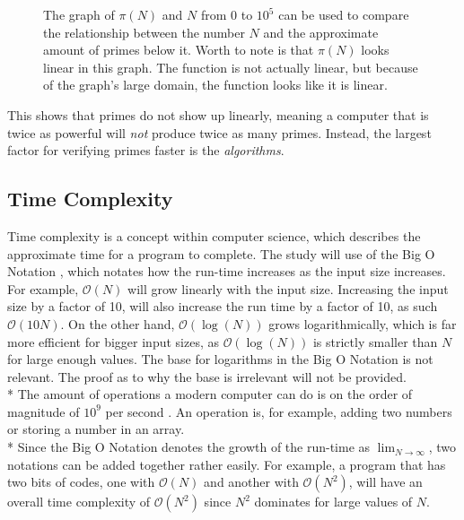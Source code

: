 \documentclass[main.tex]{subfiles}
\begin{document}
\begin{figure}[h]
  \begin{center}
  \end{center}
  \caption{The graph of $\pi(N)$ and $N$ from $0$ to $10^{5}$ can be used to
    compare the relationship between the number $N$ and the approximate amount
    of primes below it. Worth to note is that $\pi(N)$ looks linear in this
    graph. The function is not actually linear, but because of the graph's large
    domain, the function looks like it is linear.}
\end{figure}

This shows that primes do not show up linearly, meaning a computer that is
twice as powerful will \textit{not} produce twice as many primes. Instead, the
largest factor for verifying primes faster is the \textit{algorithms}.

\newpage

\subsection{Time Complexity}

Time complexity \cite{theorem:time_comp} is a concept within computer science,
which describes the approximate time for a program to complete. The study will
use of the Big O Notation \cite{theorem:big_O}, which notates how the run-time
increases as the input size increases. For example, $\mathcal{O}(N)$ will grow
linearly with the input size. Increasing the input size by a factor of 10, will
also increase the run time by a factor of 10, as such $\mathcal{O}(10N)$. On the
other hand, $\mathcal{O}(\log(N))$ grows logarithmically, which is far more
efficient for bigger input sizes, as $\mathcal{O}(\log(N))$ is strictly smaller
than $N$ for large enough values. The base for logarithms in the Big O Notation
is not relevant. The proof as to why the base is irrelevant will not be
provided. \newline
\\*
The amount of operations a modern computer can do is on the order of magnitude
of $10^{9}$ per second \cite[]{algh:johan}. An operation is, for example, adding two numbers or
storing a number in an array. \newline
\\*
Since the Big O Notation denotes the growth of the run-time as
$\lim_{N\to\infty}$, two notations can be added together rather easily. For
example, a program that has two bits of codes, one with $\mathcal{O}(N)$ and
another with $\mathcal{O}(N^{2})$, will have an overall time complexity of
$\mathcal{O}(N^{2})$ since $N^{2}$ dominates for large values of $N$.
\end{document}
